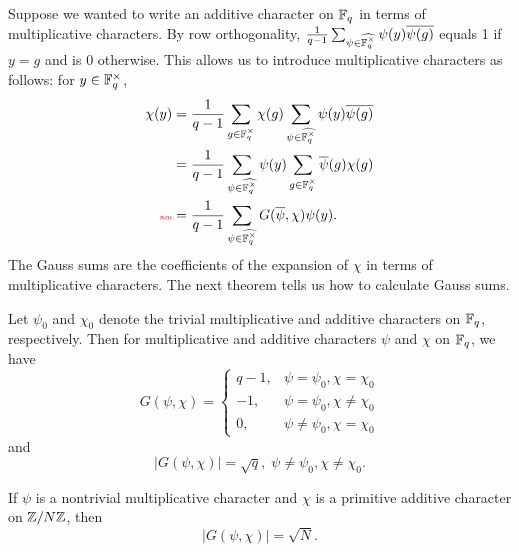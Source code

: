 Suppose we wanted to write an additive character on $\mathbb{F}_q$ in terms of multiplicative characters. %
By row orthogonality, $\frac{1}{q-1}\sum_{\psi \in \widehat{\mathbb{F}_q^{\times}}} \psi(y) \overline{\psi(g)}$ equals 1 if $y=g$ and is 0 otherwise. This allows us to  introduce multiplicative characters as follows: for $y\in \mathbb{F}_q^{\times}$,
\begin{align}
\nonumber\chi(y)
&=\rc{q-1}\sum_{g\in \F_q^{\times}}\chi(g)\sum_{\psi\in \widehat{\F_q^{\times}}} \psi(y)\overline{\psi(g)}\\
\nonumber
&=\rc{q-1}\sum_{\psi\in \widehat{\F_q^{\times}}}\psi(y)\sum_{g\in \F^{\times}_q} \overline{\psi}(g)\chi(g)\\
\llabel{am}
&=\rc{q-1}\sum_{\psi\in \widehat{\F_q^{\times}}}G(\overline{\psi},\chi)\psi(y).
\end{align}
The Gauss sums are the coefficients of the expansion of $\chi$ in terms of multiplicative characters. %
The next theorem tells us how to calculate Gauss sums.
\begin{thm}
Let $\psi_0$ and $\chi_0$ denote the trivial multiplicative and additive characters on $\mathbb{F}_q$, respectively. Then for multiplicative and additive characters $\psi$ and $\chi$ on $\mathbb{F}_q$, we have 
\[
G(\psi,\chi)
=
\begin{cases}
q-1,&\psi=\psi_0,\chi=\chi_0\\
-1,&\psi=\psi_0,\chi\neq \chi_0\\
0,&\psi\neq \psi_0,\chi= \chi_0
\end{cases}
\]
and
\[
|G(\psi,\chi)|=\sqrt q,\;\psi\neq \psi_0,\chi\neq \chi_0.
\]

If $\psi$ is a nontrivial multiplicative character and $\chi$ is a primitive additive character on $\mathbb{Z}/N\mathbb{Z}$, then 
\[
|G(\psi,\chi)|=\sqrt N.
\]
\end{thm}
